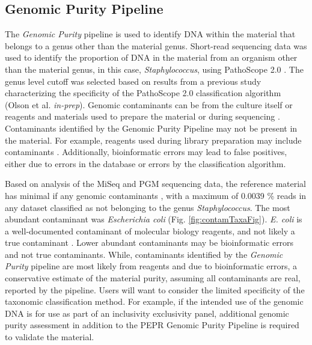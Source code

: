 \documentclass[smallextended]{svjour3}\usepackage[]{graphicx}\usepackage[]{color}
\begin{document}
\subsection{Genomic Purity Pipeline}
The \textit{Genomic Purity} pipeline is used to identify DNA within the material that belongs to a genus other than the material genus. 
Short-read sequencing data was used to identify the proportion of DNA in the material from an organism other than the material genus, in this case, \textit{Staphylococcus}, using PathoScope 2.0 \cite{Hong2014}. 
The genus level cutoff was selected based on results from a previous study characterizing the specificity of the PathoScope 2.0 classification algorithm (Olson et al. \textit{in-prep}). 
Genomic contaminants can be from the culture itself or reagents and materials used to prepare the material or during sequencing \cite{Shrestha2013,Tang2003,Salter2014}. 
Contaminants identified by the Genomic Purity Pipeline may not be present in the material. 
For example, reagents used during library preparation may include contaminants \cite{Tanner1998,Newsome2004,Motley2014,Salter2014}. 
Additionally, bioinformatic errors may lead to false positives, either due to errors in the database or errors by the classification algorithm. 

Based on analysis of the MiSeq and PGM sequencing data, the reference material has minimal if any genomic contaminants %
, with a maximum of 0.0039 \% reads in any dataset classified as not belonging to the genus \textit{Staphylococcus}. 
The most abundant contaminant was \textit{Escherichia coli} (Fig. \ref{fig:contamTaxaFig}). 
\textit{E. coli} is a well-documented contaminant of molecular biology reagents, and not likely a true contaminant \cite{Salter2014}. Lower abundant contaminants may be bioinformatic errors and not true contaminants. 
While, contaminants identified by the \textit{Genomic Purity} pipeline are most likely from reagents and due to bioinformatic errors, a conservative estimate of the material purity, assuming all contaminants are real, reported by the pipeline. 
Users will want to consider the limited specificity of the taxonomic classification method. 
For example, if the intended use of the genomic DNA is for use as part of an inclusivity exclusivity panel, additional genomic purity assessment in addition to the PEPR Genomic Purity Pipeline is required to validate the material.

\end{document}
